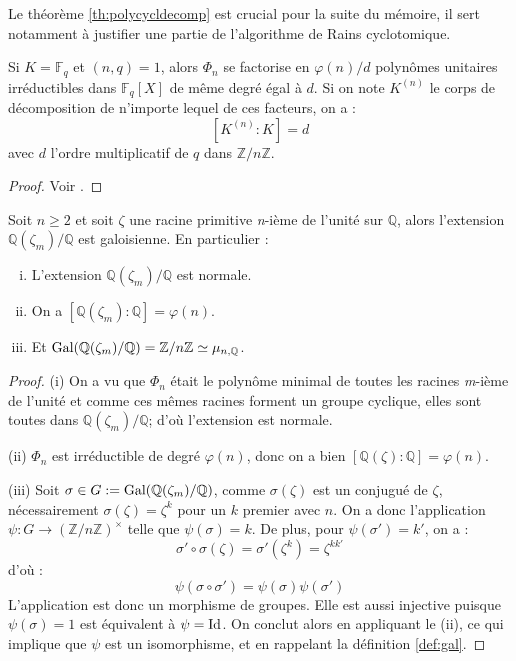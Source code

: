 \documentclass[a4paper]{article} %
\numberwithin{section}{part}
\numberwithin{equation}{section}
\newcommand\nroot[1]{\textit{#1}-ième}
\newcommand\zmodn[1]{\mathbb{Z}/#1\mathbb{Z}}
\newcommand\zmodninv[1]{(\mathbb{Z}/#1\mathbb{Z})^{\times}}
\newcommand\GF[1]{\mathbb{F}_{#1}}
\newcommand\QQ{\mathbb{Q}}
\begin{document}
Le théorème \ref{th:polycycldecomp} est crucial pour la suite du mémoire, il 
sert notamment à justifier une partie de l'algorithme de Rains cyclotomique.

\begin{thm}
\label{th:polycycldecomp}
Si $K = \GF{q}$ et $(n,q) = 1$, alors $\Phi_n$ se factorise en $\varphi(n)/d$ 
polynômes unitaires irréductibles dans $\GF{q}[X]$ de même degré égal à $d$. Si
on note $K^{(n)}$ le corps de décomposition de n'importe lequel de ces facteurs,
on a :
\[[K^{(n)}:K] = d\]
avec $d$ l'ordre multiplicatif de $q$ dans $\zmodn{n}$.
\end{thm}
\begin{proof}
Voir \cite[th. 2.47]{LiNi1}.
\end{proof}

\begin{prop}
\label{prop:cyclgal}
Soit $n \geq 2$ et soit $\zeta$ une racine primitive \nroot{n} de l'unité sur 
$\QQ$, alors l'extension $\QQ(\zeta_m)/\QQ$ est galoisienne. En particulier :
\begin{enumerate}[(i)]
\item L'extension $\QQ(\zeta_m)/\QQ$ est normale.

\item On a $[\QQ(\zeta_m):\QQ] = \varphi(n)$.

\item Et $\textup{Gal}(\QQ(\zeta_m)/\QQ) = \zmodn{n} \simeq \mu_{n,\QQ}$.
\end{enumerate}
\end{prop}
\begin{proof}
(i) On a vu que $\Phi_n$ était le polynôme minimal de toutes les racines 
\nroot{m} de l'unité et comme ces mêmes racines forment un groupe 
cyclique, elles sont toutes dans $\QQ(\zeta_m)/\QQ$; d'où l'extension est
normale.\par
(ii) $\Phi_n$ est irréductible de degré $\varphi(n)$, donc on a bien
$[\QQ(\zeta):\QQ] = \varphi(n)$.\par
(iii) Soit $\sigma\in G := \textup{Gal}(\QQ(\zeta_m)/\QQ)$, comme 
$\sigma(\zeta)$ est un conjugué de $\zeta$, nécessairement $\sigma(\zeta) = 
\zeta^k$ pour un $k$ premier avec $n$. On a donc l'application $\psi : G \to 
\zmodninv{n}$ telle que $\psi(\sigma) = k$. De plus, pour $\psi(\sigma') = k'$, 
on a :
\[\sigma'\circ\sigma(\zeta) = \sigma'(\zeta^k) = \zeta^{kk'}\]
d'où :
\[\psi(\sigma\circ\sigma') = \psi(\sigma)\psi(\sigma')\]
L'application est donc un morphisme de groupes. Elle est aussi injective puisque
$\psi(\sigma) = 1$ est équivalent à $\psi = \textup{Id}$. On conclut alors en
appliquant le (ii), ce qui implique que $\psi$ est un isomorphisme, et en 
rappelant la définition \ref{def:gal}.
\end{proof}
\end{document}
